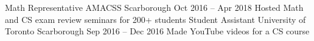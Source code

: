 \begin{cvhonors}
  \cvhonor
    {Math Representative}
    {AMACSS}
    {Scarborough}
    {Oct 2016 -- Apr 2018}
    {Hosted Math and CS exam review seminars for 200+ students}
  \cvhonor
    {Student Assistant}
    {University of Toronto}
    {Scarborough}
    {Sep 2016 -- Dec 2016}
    {Made YouTube videos for a CS course}
\end{cvhonors}